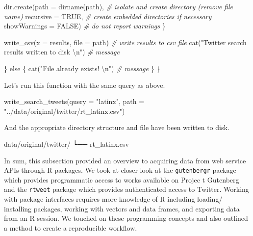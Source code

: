 \documentclass[
  letterpaper,
]{latex/krantz}
\newenvironment{Shaded}{\begin{snugshade}}{\end{snugshade}}
\newcommand{\AttributeTok}[1]{\textcolor[rgb]{0.00,0.00,0.00}{#1}}
\newcommand{\CommentTok}[1]{\textcolor[rgb]{0.00,0.00,0.00}{\textit{#1}}}
\newcommand{\ConstantTok}[1]{\textcolor[rgb]{0.00,0.00,0.00}{#1}}
\newcommand{\ControlFlowTok}[1]{\textcolor[rgb]{0.00,0.00,0.00}{#1}}
\newcommand{\ExtensionTok}[1]{\textcolor[rgb]{0.00,0.00,0.00}{#1}}
\newcommand{\FunctionTok}[1]{\textcolor[rgb]{0.00,0.00,0.00}{#1}}
\newcommand{\NormalTok}[1]{\textcolor[rgb]{0.00,0.00,0.00}{#1}}
\newcommand{\SpecialCharTok}[1]{\textcolor[rgb]{0.00,0.00,0.00}{#1}}
\newcommand{\StringTok}[1]{\textcolor[rgb]{0.00,0.00,0.00}{#1}}
\begin{document}
\begin{Shaded}
\begin{Highlighting}[]
        \FunctionTok{dir.create}\NormalTok{(}\AttributeTok{path =} \FunctionTok{dirname}\NormalTok{(path), }\CommentTok{\# isolate and create directory (remove file name)}
                   \AttributeTok{recursive =} \ConstantTok{TRUE}\NormalTok{, }\CommentTok{\# create embedded directories if necessary}
                   \AttributeTok{showWarnings =} \ConstantTok{FALSE}\NormalTok{) }\CommentTok{\# do not report warnings}
\NormalTok{      \}}
      
      \FunctionTok{write\_csv}\NormalTok{(}\AttributeTok{x =}\NormalTok{ results, }\AttributeTok{file =}\NormalTok{ path) }\CommentTok{\# write results to csv file }
      \FunctionTok{cat}\NormalTok{(}\StringTok{"Twitter search results written to disk }\SpecialCharTok{\textbackslash{}n}\StringTok{"}\NormalTok{) }\CommentTok{\# message}
      
\NormalTok{    \} }\ControlFlowTok{else}\NormalTok{ \{}
      \FunctionTok{cat}\NormalTok{(}\StringTok{"File already exists! }\SpecialCharTok{\textbackslash{}n}\StringTok{"}\NormalTok{) }\CommentTok{\# message}
\NormalTok{    \}}
\NormalTok{  \}}
\end{Highlighting}
\end{Shaded}

Let's run this function with the same query as above.

\begin{Shaded}
\begin{Highlighting}[]
\FunctionTok{write\_search\_tweets}\NormalTok{(}\AttributeTok{query =} \StringTok{"latinx"}\NormalTok{, }\AttributeTok{path =} \StringTok{"../data/original/twitter/rt\_latinx.csv"}\NormalTok{)}
\end{Highlighting}
\end{Shaded}

And the appropriate directory structure and file have been written to
disk.

\begin{Shaded}
\begin{Highlighting}[]
\ExtensionTok{data/original/twitter/}
\ExtensionTok{└──}\NormalTok{ rt\_latinx.csv}
\end{Highlighting}
\end{Shaded}

In sum, this subsection provided an overview to acquiring data from web
service APIs through R packages. We took at closer look at the
\texttt{gutenbergr} package which provides programmatic access to works
available on Projec t Gutenberg and the \texttt{rtweet} package which
provides authenticated access to Twitter. Working with package
interfaces requires more knowledge of R including loading/ installing
packages, working with vectors and data frames, and exporting data from
an R session. We touched on these programming concepts and also outlined
a method to create a reproducible workflow.
\end{document}
